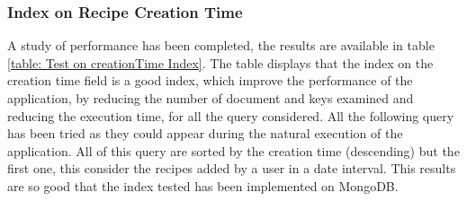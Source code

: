 \documentclass[a4paper]{report}
\begin{document}
\subsubsection{Index on Recipe Creation Time}
A study of performance has been completed, the results are available in table \ref{table: Test on creationTime Index}. The table displays that the index on the creation time field is a good index, which improve the performance of the application, by reducing the number of document and keys examined and reducing the execution time, for all the query considered. All the following query has been tried as they could appear during the natural execution of the application. All of this query are sorted by the creation time (descending) but the first one, this consider the recipes added by a user in a date interval. This results are so good that the index tested has been implemented on MongoDB.
\end{document}
